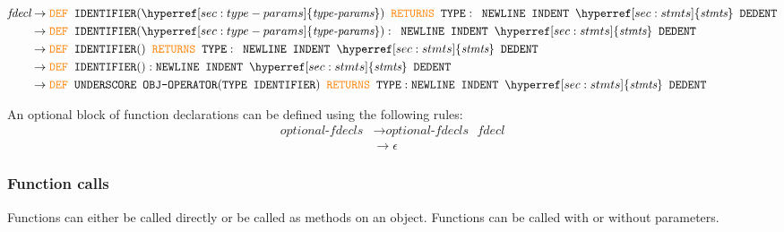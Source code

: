 \documentclass{article}
\begin{document}
\label{sec:fdecl}
\begin{align*}
    \textit{fdecl} &\to \textcolor{orange}{\texttt{DEF}} \texttt{ } \texttt{IDENTIFIER}(\hyperref[sec:type-params]{\textit{type-params}}) \texttt{ } \textcolor{orange}{\texttt{RETURNS}} \texttt{ } \texttt{TYPE}: \texttt{ } \texttt{NEWLINE} \texttt{ } \texttt{INDENT} \texttt{ } \hyperref[sec:stmts]{\textit{stmts}} \texttt{ } \texttt{DEDENT} \\
    &\to \textcolor{orange}{\texttt{DEF}} \texttt{ } \texttt{IDENTIFIER}(\hyperref[sec:type-params]{\textit{type-params}}): \texttt{ } \texttt{NEWLINE} \texttt{ } \texttt{INDENT} \texttt{ } \hyperref[sec:stmts]{\textit{stmts}} \texttt{ } \texttt{DEDENT} \\
    &\to \textcolor{orange}{\texttt{DEF}} \texttt{ } \texttt{IDENTIFIER}() \texttt{ } \textcolor{orange}{\texttt{RETURNS}} \texttt{ } \texttt{TYPE}: \texttt{ } \texttt{NEWLINE} \texttt{ } \texttt{INDENT} \texttt{ } \hyperref[sec:stmts]{\textit{stmts}} \texttt{ } \texttt{DEDENT} \\
    &\to \textcolor{orange}{\texttt{DEF}} \texttt{ } \texttt{IDENTIFIER}(): \texttt{NEWLINE} \texttt{ } \texttt{INDENT} \texttt{ } \hyperref[sec:stmts]{\textit{stmts}} \texttt{ } \texttt{DEDENT} \\
    &\to \textcolor{orange}{\texttt{DEF}} \texttt{ } \texttt{UNDERSCORE} \texttt{ } \texttt{OBJ-OPERATOR}(\texttt{TYPE IDENTIFIER})\texttt{ } \textcolor{orange}{\texttt{RETURNS}} \texttt{ } \texttt{TYPE}: \texttt{NEWLINE} \texttt{ } \texttt{INDENT} \texttt{ } \hyperref[sec:stmts]{\textit{stmts}} \texttt{ } \texttt{DEDENT} \\
\end{align*}

An optional block of function declarations can be defined using the following rules:
\label{sec:optional-fdecls}
\begin{align*}
    \textit{optional-fdecls} &\to \hyperref[sec:optional-fdecls]{\textit{optional-fdecls}} \texttt{ } \hyperref[sec:fdecl]{\textit{fdecl}} \\
    &\to \epsilon
\end{align*}

\subsubsection{Function calls}
Functions can either be called directly or be called as methods on an object. Functions can be called with or without parameters.
\end{document}
